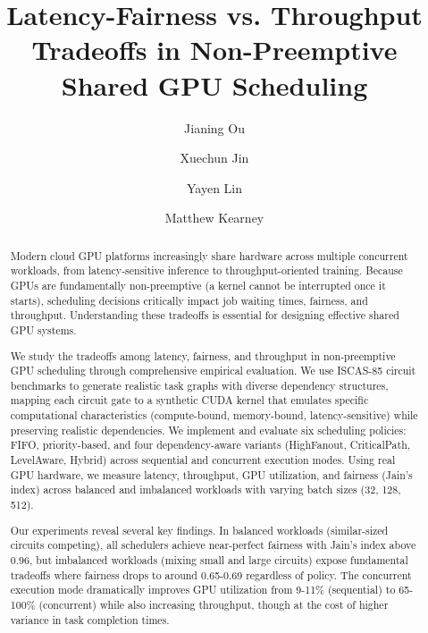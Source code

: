 \documentclass[acmengage]{acmart}
\begin{document}
\fancyhead{} %
\fancyfoot{} %
\fancyfoot[C]{\thepage} %


\title{Latency-Fairness vs. Throughput Tradeoffs in Non-Preemptive Shared GPU Scheduling}

\author{Jianing Ou}

\author{Xuechun Jin}

\author{Yayen Lin}

\author{Matthew Kearney}



\begin{abstract}
Modern cloud GPU platforms increasingly share hardware across multiple concurrent workloads, from latency-sensitive inference to throughput-oriented training. Because GPUs are fundamentally non-preemptive (a kernel cannot be interrupted once it starts), scheduling decisions critically impact job waiting times, fairness, and throughput. Understanding these tradeoffs is essential for designing effective shared GPU systems.

We study the tradeoffs among latency, fairness, and throughput in non-preemptive GPU scheduling through comprehensive empirical evaluation. We use ISCAS-85 circuit benchmarks to generate realistic task graphs with diverse dependency structures, mapping each circuit gate to a synthetic CUDA kernel that emulates specific computational characteristics (compute-bound, memory-bound, latency-sensitive) while preserving realistic dependencies. We implement and evaluate six scheduling policies: FIFO, priority-based, and four dependency-aware variants (HighFanout, CriticalPath, LevelAware, Hybrid) across sequential and concurrent execution modes. Using real GPU hardware, we measure latency, throughput, GPU utilization, and fairness (Jain's index) across balanced and imbalanced workloads with varying batch sizes (32, 128, 512).

Our experiments reveal several key findings. In balanced workloads (similar-sized circuits competing), all schedulers achieve near-perfect fairness with Jain's index above 0.96, but imbalanced workloads (mixing small and large circuits) expose fundamental tradeoffs where fairness drops to around 0.65-0.69 regardless of policy. The concurrent execution mode dramatically improves GPU utilization from 9-11\% (sequential) to 65-100\% (concurrent) while also increasing throughput, though at the cost of higher variance in task completion times.
\end{abstract}
\end{document}

